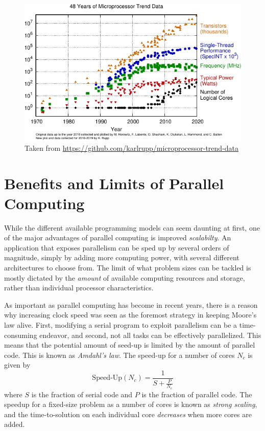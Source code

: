 \begin{figure}
\centering
\includegraphics[scale=1.2]{Pics/moore}
\caption[Moore's Law]{Taken from \protect\url{https://github.com/karlrupp/microprocessor-trend-data}}
\label{fig:MOORE}
\end{figure}

\section{Benefits and Limits of Parallel Computing}

While the different available programming models can seem daunting at first, one of the major advantages of parallel computing is improved \emph{scalabilty}. An application that exposes parallelism can be sped up by several orders of magnitude, simply by adding more computing power, with several different architectures to choose from. The limit of what problem sizes can be tackled is mostly dictated by the \emph{amount} of available computing resources and storage, rather than individual processor characteristics.

As important as parallel computing has become in recent years, there is a reason why increasing clock speed was seen as the foremost strategy in keeping Moore's law alive. First, modifying a serial program to exploit parallelism can be a time-consuming endeavor, and second, not all tasks can be effectively parallelized. This means that the potential amount of seed-up is limited by the amount of parallel code. This is known as \emph{Amdahl's law}. The speed-up for a number of cores $N_c$ is given by
\begin{equation}
\textrm{Speed-Up}(N_c) = \frac{1}{S + \frac{P}{N_c}}
\end{equation}
\noindent where $S$ is the fraction of serial code and $P$ is the fraction of parallel code. The speedup for a fixed-size problem as a number of cores is known as \emph{strong scaling}, and the time-to-solution on each individual core \emph{decreases} when more cores are added.

